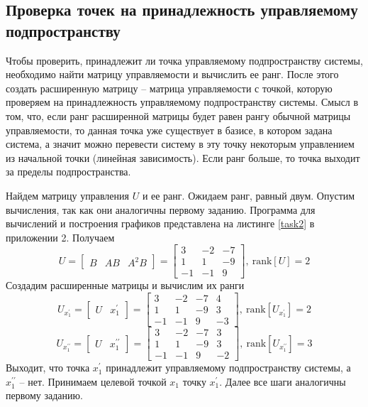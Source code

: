\documentclass[a4paper, 12pt]{article}
\begin{document}
    \subsection{Проверка точек на принадлежность управляемому подпространству}
    Чтобы проверить, принадлежит ли точка управляемому подпространству системы, необходимо найти матрицу управляемости
    и вычислить ее ранг. После этого создать расширенную матрицу -- матрица управляемости с точкой, которую проверяем на принадлежность
    управляемому подпространству системы. Смысл в том, что, если ранг расширенной матрицы будет равен рангу обычной матрицы управляемости,
    то данная точка уже существует в базисе, в котором задана система, а значит можно перевести систему в эту точку некоторым управлением из
    начальной точки (линейная зависимость). Если ранг больше, то точка выходит за пределы подпространства.


    Найдем матрицу управления $U$ и ее ранг. Ожидаем ранг, равный двум. Опустим вычисления, так как они аналогичны первому заданию. Программа для
    вычислений и построения графиков представлена на листинге \ref{task2} в приложении 2. Получаем
    $$
    U=\begin{bmatrix}
        B &AB &A^2B
    \end{bmatrix}=\begin{bmatrix}
    3    &-2    &-7\\
     1     &1    &-9\\
    -1    &-1     &9
    \end{bmatrix},\ \text{rank}\left[U\right]=2
    $$
    Создадим расширенные матрицы и вычислим их ранги
    $$
    U_{x_1^{\prime}}=\begin{bmatrix}
        U &x_1^{\prime}
    \end{bmatrix}=\begin{bmatrix}
    3    &-2    &-7     &4\\
     1     &1    &-9     &3\\
    -1    &-1     &9    &-3
    \end{bmatrix},\ \text{rank}\left[U_{x_1^{\prime}}\right]=2
    $$
    $$
    U_{x_1^{\prime\prime}}=\begin{bmatrix}
        U &x_1^{\prime\prime}
    \end{bmatrix}=\begin{bmatrix}
    3    &-2    &-7     &3\\
     1     &1    &-9     &3\\
    -1    &-1     &9    &-2
    \end{bmatrix},\ \text{rank}\left[U_{x_1^{\prime\prime}}\right]=3
    $$
    Выходит, что точка $x_1^{\prime}$ принадлежит управляемому подпространству системы, а $x_1^{\prime\prime}$ -- нет.
    Принимаем целевой точкой $x_1$ точку $x_1^{\prime}$. Далее все шаги аналогичны первому заданию.
\end{document}
